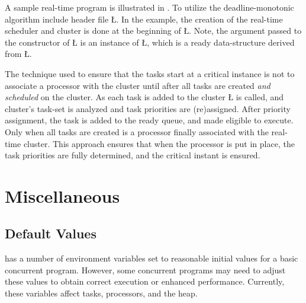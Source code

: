 \documentclass[openright,twoside]{report}
\begin{document}
A sample real-time program is illustrated in .  
To utilize the deadline-monotonic algorithm include header file \LGinlinetrue\LGbegin\lgrinde\L{}\endlgrinde\LGend{}.
In the example, the creation of the real-time scheduler and cluster is done at the beginning of \LGinlinetrue\LGbegin\lgrinde\L{}\endlgrinde\LGend{}.
Note, the argument passed to the constructor of \LGinlinetrue\LGbegin\lgrinde\L{}\endlgrinde\LGend{} is an instance of \LGinlinetrue\LGbegin\lgrinde\L{}\endlgrinde\LGend{}, which is a ready data-structure derived from \LGinlinetrue\LGbegin\lgrinde\L{}\endlgrinde\LGend{}.

The technique used to ensure that the tasks start at a critical instance is not to associate a processor with the cluster until after all tasks are created \emph{and scheduled} on the cluster.
As each task is added to the cluster \LGinlinetrue\LGbegin\lgrinde\L{}\endlgrinde\LGend{} is called, and cluster's task-set is analyzed and task priorities are (re)assigned.
After priority assignment, the task is added to the ready queue, and made eligible to execute.
Only when all tasks are created is a processor finally associated with the real-time cluster.
This approach ensures that when the processor is put in place, the task priorities are fully determined, and the critical instant is ensured.


\chapter{Miscellaneous}
\label{c:Miscellaneous}


\section{Default Values}
\label{s:DefaultValues}

\uC has a number of environment variables set to reasonable initial values for a basic concurrent program.
However, some concurrent programs may need to adjust these values to obtain correct execution or enhanced performance.
Currently, these variables affect tasks, processors, and the heap.
\end{document}
